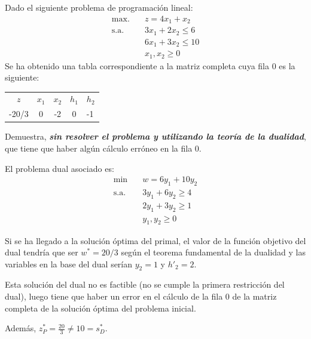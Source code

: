 Dado el siguiente problema de programación lineal:
\begin{align*}
\text{max.} \quad & z = 4x_1 + x_2 \\
\text{s.a.} \quad & 3x_1 + 2x_2 \leq 6 \\
                 & 6x_1 + 3x_2 \leq 10 \\
                 & x_1, x_2 \geq 0
\end{align*}
Se ha obtenido una tabla correspondiente a la matriz completa cuya fila 0 es la siguiente:

\begin{table}[h]
\begin{center}
\begin{tabular}{ccccc}
$z$                         & $x_1$ & $x_2$ & $h_1$ & $h_2$                   \\
\multicolumn{1}{|l|}{-20/3} & 0     & -2    & 0     & \multicolumn{1}{l|}{-1} \\ \hline
\end{tabular}
\end{center}
\end{table}
    

Demuestra, \textbf{\textit{sin resolver el problema y utilizando la teoría de la dualidad}}, que tiene que haber algún cálculo erróneo en la fila 0.



El problema dual asociado es:
\begin{align*}
\min \quad & w = 6y_1 + 10y_2 \\
\text{s.a.} \quad & 3y_1 + 6y_2 \geq 4 \\
                  & 2y_1 + 3y_2 \geq 1 \\
                  & y_1, y_2 \geq 0
\end{align*}

Si se ha llegado a la solución óptima del primal, el valor de la función objetivo del dual tendría que ser $w^*=20/3$ según el teorema fundamental de la dualidad y las variables en la base del dual serían $y_2=1$ y $h'_2=2$.

Esta solución del dual no es factible (no se cumple la primera restricción del dual), luego tiene que haber un error en el cálculo de la fila 0 de la matriz completa de la solución óptima del problema inicial.

Además, $z^*_P=\frac{20}{3}\neq 10=s^*_D$.

